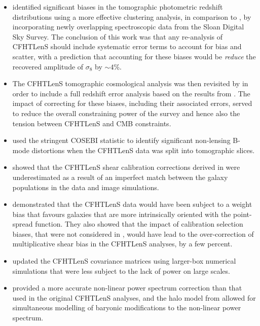 \begin{itemize}
%
 \item{\citet{2016MNRAS.463.3737C} identified significant biases in the tomographic
photometric redshift distributions using a more effective clustering analysis,
in comparison to \citet{CFHTLenS-2pt-tomo}, by incorporating newly overlapping
spectroscopic data from the Sloan Digital Sky Survey.  The conclusion of this
work was that any re-analysis of CFHTLenS should include systematic error terms
to account for bias and scatter, with a prediction that accounting for these
biases would be {\it reduce} the recovered amplitude of $\sigma_8$ by $\sim
4$\%.}
%
\item{The CFHTLenS tomographic cosmological analysis was then revisited by
\citet{joudaki/etal:2016} in order to include a full redshift error analysis
based on the results from \citet{2016MNRAS.463.3737C}.  The impact of
correcting for these biases, including their associated errors, served to
reduce the overall constraining power of the survey and hence also the tension
between CFHTLenS and CMB constraints.}
%
 \item{\citet{2016arXiv160100115A} used the stringent COSEBI statistic
\cite{COSEBIs} to identify significant non-lensing B-mode distortions when the
CFHTLenS data was split into tomographic slices.}
%
\item{\citet{2015MNRAS.454.3500K} showed that the CFHTLenS shear calibration
corrections derived in \citet{CFHTLenS-shapes} were underestimated as a result
of an imperfect match between the galaxy populations in the data and image
simulations.}
%
\item{\citet{2016arXiv160605337F} demonstrated that the CFHTLenS data would
have been subject to a weight bias that favours galaxies that are more
intrinsically oriented with the point-spread function.  They also showed that
the impact of calibration selection biases, that were not considered in
\citet{CFHTLenS-shapes}, would have lead to the over-correction of
multiplicative shear bias in the CFHTLenS analyses, by a few percent.}
%
\item{\citet{joudaki/etal:2016} updated the CFHTLenS covariance matrices using
larger-box numerical simulations that were less subject to the lack of power on
large scales.}
\item{\cite{2012ApJ...761..152T} provided a more accurate non-linear power
spectrum correction than that used in the original CFHTLenS analyses, and the
halo model from \cite{2015MNRAS.454.1958M} allowed for simultaneous modelling
of baryonic modifications to the non-linear power spectrum.} 
%
\end{itemize}
